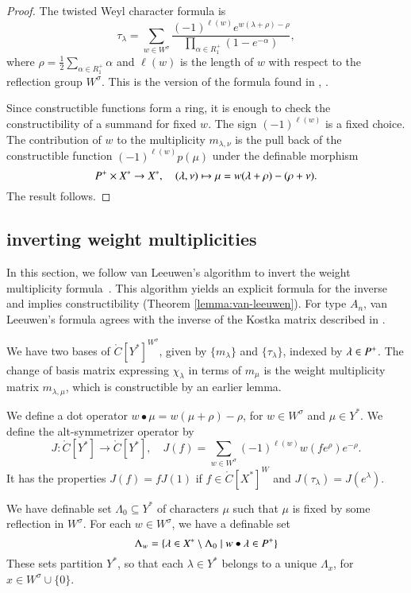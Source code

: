 \begin{proof} 
The twisted Weyl character formula is
\[
\tau_\lambda = \sum_{w\in W^\sigma} \frac{(-1)^{\ell(w)} e^{w (\lambda+\rho)-\rho}}{ \prod_{\alpha\in R_1^+} (1 - e^{-\alpha})},
\]
where $\rho = \frac{1}{2} \sum_{\alpha\in R_1^+} \alpha$ and $\ell(w)$ is the length of $w$ with respect to the reflection group $W^\sigma$.
This is the version of the formula found in \cite{chriss}, \cite{haines2016dualities}.



Since constructible functions form a ring, it is enough to check the constructibility of a summand for
fixed $w$.  The sign $(-1)^{\ell(w)}$ is a fixed choice.  The contribution of $w$ to the multiplicity $m_{\lambda,\nu}$ is the
pull back of the constructible function $(-1)^{\ell(w)} p(\mu)$ under the definable morphism
\[
P^+\times X^*\to X^*,\quad (\lambda,\nu)\mapsto \mu = w(\lambda+\rho)-(\rho+\nu).
\]
The result follows.
\end{proof}



\subsection{inverting weight multiplicities}

In this section, we follow  van Leeuwen's algorithm to invert the weight multiplicity
formula~\cite{vanleeuwen}.  This algorithm yields an explicit formula for the inverse and 
implies constructibility (Theorem \ref{lemma:van-leeuwen}).
For type $A_n$, van Leeuwen's formula agrees with the inverse of the Kostka
matrix described in \cite{duan}.


We have two bases of $\ring{C}[Y^*]^{W^\sigma}$, given by $\{m_\lambda\}$ and $\{\tau_\lambda\}$, indexed
by $\lambda\in P^+$.  
The change of basis matrix expressing $\chi_\lambda$ in terms of $m_\mu$ is the weight multiplicity
matrix $m_{\lambda,\mu}$, which is constructible by an earlier lemma. 

We define a dot operator $w\bullet \mu = w(\mu+\rho)-\rho$, for $w\in W^\sigma$ and $\mu\in Y^*$.
We define the alt-symmetrizer operator by
\[
J:\ring{C}[Y^*]\to \ring{C}[Y^*],\quad J(f) = \sum_{w\in W^\sigma} (-1)^{\ell(w)} w(f e^\rho) e^{-\rho}.
\]
It has the properties $J(f) = f J(1)$ if $f\in \ring{C}[X^*]^W$ and $J(\tau_\lambda) = J(e^\lambda)$.


We have definable set $\Lambda_0\subseteq Y^*$ of characters $\mu$ such that $\mu$ is fixed by some
reflection in $W^\sigma$.  For each $w\in W^\sigma$, we have a definable set 
\[
\Lambda_w = \{\lambda\in X^*\setminus \Lambda_0\mid w\bullet \lambda \in P^+\}
\]
These sets partition $Y^*$, so that each $\lambda\in Y^*$ belongs to a unique $\Lambda_x$, for $x\in W^\sigma\cup\{0\}$.

